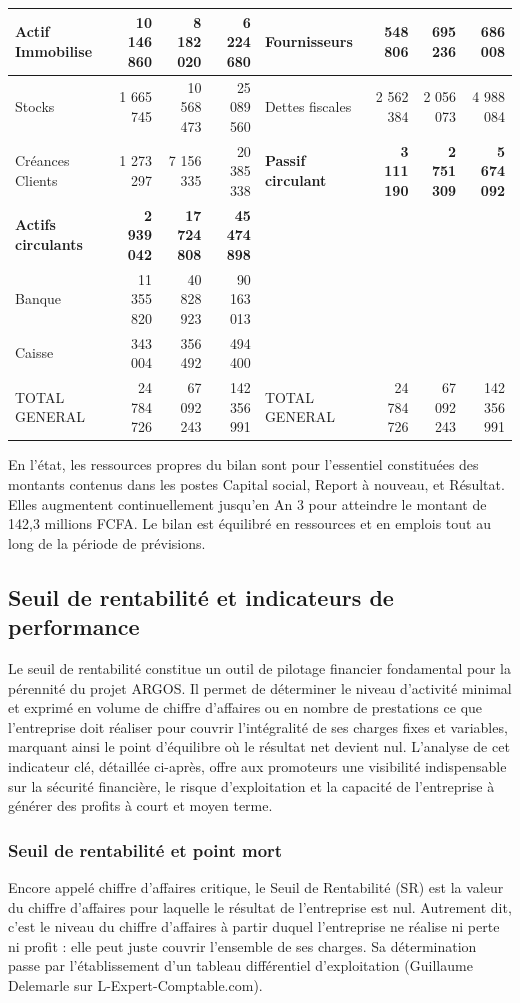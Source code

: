 \begin{xltabular}{\textwidth}{@{} X r r r X r r r @{}}
\midrule
{}\textbf{Actif Immobilise} & \textbf{10 146 860} & \textbf{8 182 020} & \textbf{6 224 680} & Fournisseurs & 548 806 & 695 236 & 686 008 \\
\midrule
Stocks & 1 665 745 & 10 568 473 & 25 089 560 & Dettes fiscales & 2 562 384 & 2 056 073 & 4 988 084 \\
Créances Clients & 1 273 297 & 7 156 335 & 20 385 338 & \textbf{Passif circulant} & \textbf{3 111 190} & \textbf{2 751 309} & \textbf{5 674 092} \\
\textbf{Actifs circulants} & \textbf{2 939 042} & \textbf{17 724 808} & \textbf{45 474 898} & & & & \\
\midrule
Banque & 11 355 820 & 40 828 923 & 90 163 013 & & & & \\
Caisse & 343 004 & 356 492 & 494 400 & & & & \\
TOTAL GENERAL & 24 784 726 & 67 092 243 & 142 356 991 & TOTAL GENERAL & 24 784 726 & 67 092 243 & 142 356 991 \\
\end{xltabular}

En l'état, les ressources propres du bilan sont pour l'essentiel constituées des montants contenus dans les postes Capital social, Report à nouveau, et Résultat. Elles augmentent continuellement jusqu'en An 3 pour atteindre le montant de 142,3 millions FCFA. Le bilan est équilibré en ressources et en emplois tout au long de la période de prévisions.

\subsection{Seuil de rentabilité et indicateurs de performance}
Le seuil de rentabilité constitue un outil de pilotage financier fondamental pour la pérennité du projet ARGOS. 
Il permet de déterminer le niveau d'activité minimal et exprimé en volume de chiffre d'affaires ou en nombre de prestations ce que l'entreprise doit réaliser pour couvrir l'intégralité de ses charges fixes et variables, 
marquant ainsi le point d'équilibre où le résultat net devient nul. 
L'analyse de cet indicateur clé, détaillée ci-après, offre aux promoteurs une visibilité indispensable sur la sécurité financière, 
le risque d'exploitation et la capacité de l'entreprise à générer des profits à court et moyen terme.

\subsubsection{Seuil de rentabilité et point mort}
Encore appelé chiffre d'affaires critique, le Seuil de Rentabilité (SR) est la valeur du chiffre d'affaires pour laquelle le résultat de l'entreprise est nul. Autrement dit, c'est le niveau du chiffre d'affaires à partir duquel l'entreprise ne réalise ni perte ni profit : elle peut juste couvrir l'ensemble de ses charges. Sa détermination passe par l'établissement d'un tableau différentiel d'exploitation (Guillaume Delemarle sur L-Expert-Comptable.com).

